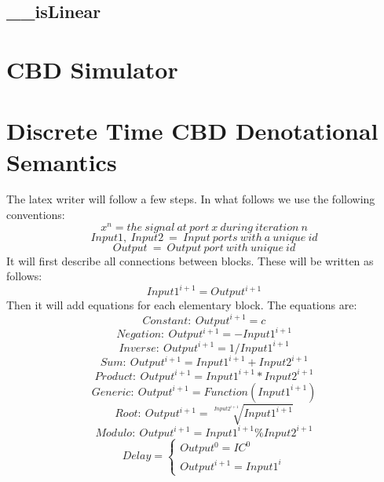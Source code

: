 \documentclass{article}
\begin{document}
\subsection{\_\_isLinear}

\section{CBD Simulator}
\section{Discrete Time CBD Denotational Semantics}
The latex writer will follow a few steps. In what follows we use the following conventions:
\[x^{n} = the\ signal\ at\ port\ x\ during\ iteration\ n\]
\[Input1,\ Input2\ =\ Input\ ports\ with\ a\ unique\ id\]
\[Output\ =\ Output\ port\ with\ unique\ id\]
 It will first describe all connections between blocks. These will be written as follows:
\[Input1^{i+1} = Output^{i+1}\]
Then it will add equations for each elementary block. The equations are:
\[Constant:\ Output^{i+1} = c\]
\[Negation:\ Output^{i+1} = -Input1^{i+1}\]
\[Inverse:\ Output^{i+1} = 1/Input1^{i+1}\]
\[Sum:\ Output^{i+1}=Input1^{i+1}+Input2^{i+1}\]
\[Product:\ Output^{i+1}=Input1^{i+1}*Input2^{i+1}\]
\[Generic:\ Output^{i+1}=Function(Input1^{i+1})\]
\[Root:\ Output^{i+1}=\sqrt[Input2^{i+1}]{Input1^{i+1}}\]
\[Modulo:\ Output^{i+1}=Input1^{i+1}\%Input2^{i+1}\]
\[
 Delay = 
  \begin{cases} 
    Output^{0} = IC^{0}\\
    Output^{i+1} = Input1^{i}
  \end{cases}
\]
\end{document}
